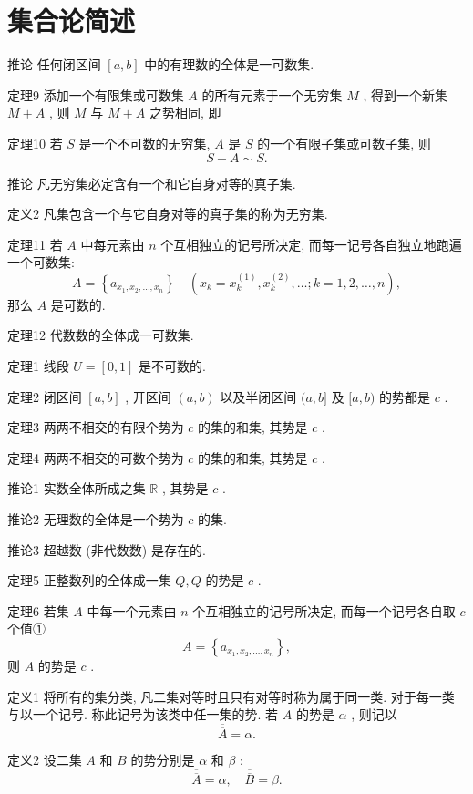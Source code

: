 \documentclass[]{article}
\title{}
\author{today}
\author{Tamagawa}
\begin{document}
	
\maketitle

\section{集合论简述}

推论 任何闭区间 $[a, b]$ 中的有理数的全体是一可数集. 

定理9 添加一个有限集或可数集 $A$ 的所有元素于一个无穷集 $M$ , 得到一个新集 $M + A$ , 则 $M$ 与 $M + A$ 之势相同, 即 

定理10 若 $S$ 是一个不可数的无穷集, $A$ 是 $S$ 的一个有限子集或可数子集, 则 $$
S - A \sim S.
$$

推论 凡无穷集必定含有一个和它自身对等的真子集. 

定义2 凡集包含一个与它自身对等的真子集的称为无穷集. 

定理11 若 $A$ 中每元素由 $n$ 个互相独立的记号所决定, 而每一记号各自独立地跑遍一个可数集: $$
A = \left\{a _ {x _ {1}, x _ {2}, \dots , x _ {n}} \right\} \quad (x _ {k} = x _ {k} ^ {(1)}, x _ {k} ^ {(2)}, \dots ; k = 1, 2, \dots , n),
$$那么 $A$ 是可数的. 

定理12 代数数的全体成一可数集. 

定理1 线段 $U = [0,1]$ 是不可数的. 

定理2 闭区间 $[a, b]$ , 开区间 $(a, b)$ 以及半闭区间 $(a, b]$ 及 $[a, b)$ 的势都是 $c$ . 

定理3 两两不相交的有限个势为 $c$ 的集的和集, 其势是 $c$ . 

定理4 两两不相交的可数个势为 $c$ 的集的和集, 其势是 $c$ . 

推论1 实数全体所成之集 $\mathbb{R}$ , 其势是 $c$ . 

推论2 无理数的全体是一个势为 $c$ 的集. 

推论3 超越数 (非代数数) 是存在的. 

定理5 正整数列的全体成一集 $Q, Q$ 的势是 $c$ . 

定理6 若集 $A$ 中每一个元素由 $n$ 个互相独立的记号所决定, 而每一个记号各自取 $c$ 个值① $$
A = \left\{a _ {x _ {1}, x _ {2}, \dots , x _ {n}} \right\},
$$则 $A$ 的势是 $c$ . 

定义1 将所有的集分类, 凡二集对等时且只有对等时称为属于同一类. 对于每一类与以一个记号. 称此记号为该类中任一集的势. 若 $A$ 的势是 $\alpha$ , 则记以 $$
\overline {{\overline {{A}}}} = \alpha .
$$

定义2 设二集 $A$ 和 $B$ 的势分别是 $\alpha$ 和 $\beta$ : $$
\overline {{\overline {{A}}}} = \alpha , \quad \overline {{\overline {{B}}}} = \beta .
$$
\end{document}
